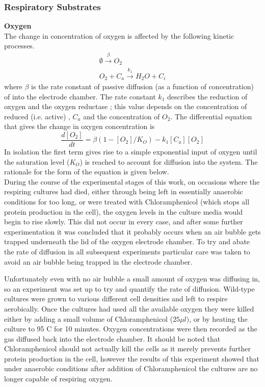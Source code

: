 \subsubsection{Respiratory Substrates}
{\bf Oxygen}\\
The change in concentration of oxygen is affected by the following kinetic processes.
\begin{equation*}
\begin{gathered}
\emptyset\xrightarrow{\beta} O_2\\
O_2 + C_a\xrightarrow{k_1} H_{2}O + C_i
\end{gathered}
\end{equation*}
where $\beta$ is the rate constant of passive diffusion (as a function of \cOxygen{} concentration) of \cOxygen{} into the electrode chamber. The rate constant $k_1$ describes the reduction of oxygen and the oxygen reductase \cbbthree{}; this value depends on the concentration of reduced (i.e. active) \cbbthree{}, $C_a$ and the concentration of $O_2$.
The differential equation that gives the change in oxygen concentration is
\begin{equation}
\frac{d[O_2]}{dt} = \beta(1-[O_2]/K_O) - k_{1}[C_a][O_2]
\label{eq:oxygen}
\end{equation}
In isolation the first term gives rise to a simple exponential input of oxygen until the saturation level ($K_O$) is reached to account for diffusion into the system. The rationale for the form of the equation is given below.\\
\noindent
During the course of the experimental stages of this work, on occasions where the respiring cultures had died, either through being left in essentially anaerobic conditions for too long, or were treated with Chloramphenicol (which stops all protein production in the cell), the oxygen levels in the culture media would begin to rise slowly. This did not occur in every case, and after some further experimentation it was concluded that it probably occurs when an air bubble gets trapped underneath the lid of the oxygen electrode chamber. To try and abate the rate of diffusion in all subsequent experiments particular care was taken to avoid an air bubble being trapped in the electrode chamber.

Unfortunately even with no air bubble a small amount of oxygen was diffusing in, so an experiment was set up to try and quantify the rate of diffusion. Wild-type \Nm{} cultures were grown to various different cell densities and left to respire aerobically. Once the cultures had used all the available oxygen they were killed either by adding a small volume of Chloramphenicol ($25 \mu l)$, or by heating the culture to 95 \textdegree{}C for 10 minutes. Oxygen concentrations were then recorded as the gas diffused back into the electrode chamber. It should be noted that Chloramphenicol should not actually kill the cells as it merely prevents further protein production in the cell, however the results of this experiment showed that under anaerobic conditions after addition of Chloramphenicol the cultures are no longer capable of respiring oxygen.

